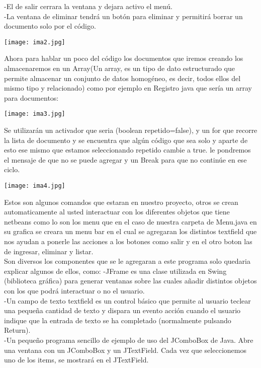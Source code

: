\documentclass{article}
\begin{document}
\begin{multicols}{2}
-El de salir cerrara la ventana y dejara activo el menú. \\
-La ventana de eliminar tendrá un botón para eliminar y permitirá borrar un documento solo por el código. \\
\begin{center}
\texttt{[image: ima2.jpg]} 
\end{center} 
Ahora para hablar un poco del código los documentos que iremos creando los almacenaremos en un Array(Un array, es un tipo de dato estructurado que permite almacenar un conjunto de datos homogéneo, es decir, todos ellos del mismo tipo y relacionado) como por ejemplo en Registro java que sería un array para documentos: \\
\begin{center}
\texttt{[image: ima3.jpg]} 
\end{center} 
Se utilizarán un activador que seria (boolean repetido=false), y un for que recorre la lista de documento y se encuentra que algún código que sea solo y aparte de esto ese mismo que estamos seleccionando repetido cambie a true. le pondremos el mensaje de que no se puede agregar y un Break para que no continúe en ese ciclo. \\
\begin{center}
\texttt{[image: ima4.jpg]} 
\end{center}
Estos son algunos comandos que estaran en nuestro proyecto, otros se crean automaticamente al usted interactuar con los diferentes objetos que tiene netbeans como lo son los menu que en el caso de nuestra carpeta de Menu.java en su grafica se creara un menu bar en el cual se agregaran los distintos textfield que nos ayudan a ponerle las acciones a los botones como salir y en el otro boton las de ingresar, eliminar y listar. \\
Son diversos los componentes que se le agregaran a este programa solo quedaria explicar algunos de ellos, como:
-JFrame es una clase utilizada en Swing (biblioteca gráfica) para generar ventanas sobre las cuales añadir distintos objetos con los que podrá interactuar o no el usuario. \\
-Un campo de texto textfield es un control básico que permite al usuario teclear una pequeña cantidad de texto y dispara un evento acción cuando el usuario indique que la entrada de texto se ha completado (normalmente pulsando Return). \\
-Un pequeño programa sencillo de ejemplo de uso del JComboBox de Java. Abre una ventana con un JComboBox y un JTextField. Cada vez que seleccionemos uno de los items, se mostrará en el JTextField. \\

\end{multicols}
\end{document}
